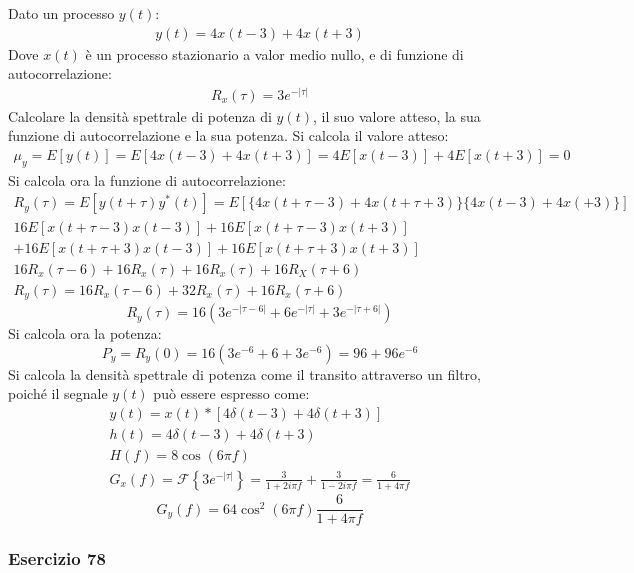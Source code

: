\documentclass{article}
\begin{document}
Dato un processo $y(t)$:
\begin{gather*}
    y(t)=4x(t-3)+4x(t+3)
\end{gather*}
Dove $x(t)$ è un processo stazionario a valor medio nullo, e di funzione di autocorrelazione:
\begin{gather*}
    R_x(\tau)=3e^{-|\tau|}
\end{gather*}
Calcolare la densità spettrale di potenza di $y(t)$, il suo valore atteso, la sua funzione di autocorrelazione e la sua potenza. 
Si calcola il valore atteso:
\begin{gather}
    \mu_y=E[y(t)]=E[4x(t-3)+4x(t+3)]=4E[x(t-3)]+4E[x(t+3)]=0
\end{gather}
Si calcola ora la funzione di autocorrelazione:
\begin{gather*}
    R_y(\tau)=E[y(t+\tau)y^*(t)]=E[\{4x(t+\tau-3)+4x(t+\tau+3)\}\{4x(t-3)+4x(+3)\}]\\
    16E[x(t+\tau-3)x(t-3)]+16E[x(t+\tau-3)x(t+3)]\\
    +16E[x(t+\tau+3)x(t-3)]+16E[x(t+\tau+3)x(t+3)]\\
    16R_x(\tau-6)+16R_x(\tau)+16R_x(\tau)+16R_X(\tau+6)\\
    R_y(\tau)=16R_x(\tau-6)+32R_x(\tau)+16R_x(\tau+6)
\end{gather*}
\begin{equation}
    R_y(\tau)=16\left(3e^{-|\tau-6|}+6e^{-|\tau|}+3e^{-|\tau+6|}\right)
\end{equation}
Si calcola ora la potenza:
\begin{equation}
    P_y=R_y(0)=16(3e^{-6}+6+3e^{-6})=96+96e^{-6}
\end{equation}
Si calcola la densità spettrale di potenza come il transito attraverso un filtro, poiché il segnale $y(t)$ può essere espresso come:
\begin{gather*}
    y(t)=x(t)*[4\delta(t-3)+4\delta(t+3)]\\
    h(t)=4\delta(t-3)+4\delta(t+3)\\
    H(f)=\displaystyle8\cos(6\pi f)\\
    G_x(f)=\mathscr{F}\left\{3e^{-|\tau|}\right\}=\displaystyle\frac{3}{1+2i\pi f}+\frac{3}{1-2i\pi f}=\frac{6}{1+4\pi f}
\end{gather*}
\begin{equation}
    G_y(f)=64\cos^2(6\pi f)\displaystyle\frac{6}{1+4\pi f}
\end{equation}

\subsubsection*{Esercizio 78}
\end{document}
